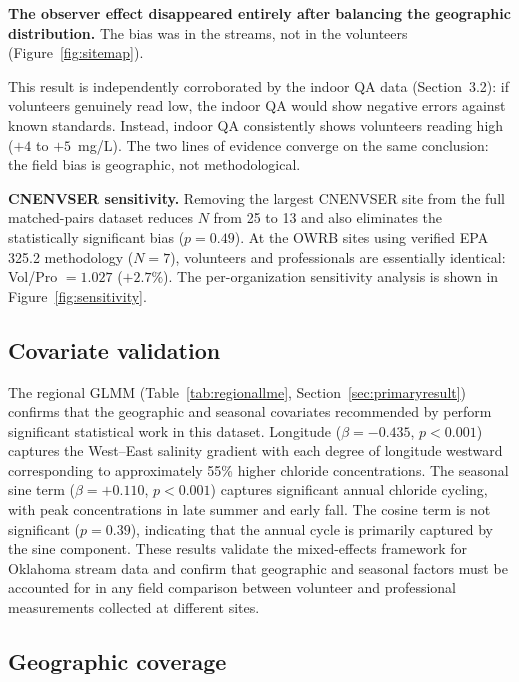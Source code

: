 \documentclass[lineno]{wlpeerj}
\begin{document}
\textbf{The observer effect disappeared entirely after balancing the geographic distribution.} The bias was in the streams, not in the volunteers (Figure~\ref{fig:sitemap}).

This result is independently corroborated by the indoor QA data (Section~3.2): if volunteers genuinely read low, the indoor QA would show negative errors against known standards. Instead, indoor QA consistently shows volunteers reading high ($+4$ to $+5$~mg/L). The two lines of evidence converge on the same conclusion: the field bias is geographic, not methodological.

\textbf{CNENVSER sensitivity.} Removing the largest CNENVSER site from the full matched-pairs dataset reduces $N$ from 25 to 13 and also eliminates the statistically significant bias ($p = 0.49$). At the OWRB sites using verified EPA 325.2 methodology ($N=7$), volunteers and professionals are essentially identical: Vol/Pro $= 1.027$ ($+2.7\%$). The per-organization sensitivity analysis is shown in Figure~\ref{fig:sensitivity}.

\subsection{Covariate validation}

The regional GLMM (Table~\ref{tab:regionallme}, Section~\ref{sec:primaryresult}) confirms that the geographic and seasonal covariates recommended by \citet{Dyer2025} perform significant statistical work in this dataset. Longitude ($\beta = -0.435$, $p < 0.001$) captures the West--East salinity gradient with each degree of longitude westward corresponding to approximately 55\% higher chloride concentrations. The seasonal sine term ($\beta = +0.110$, $p < 0.001$) captures significant annual chloride cycling, with peak concentrations in late summer and early fall. The cosine term is not significant ($p = 0.39$), indicating that the annual cycle is primarily captured by the sine component. These results validate the mixed-effects framework for Oklahoma stream data and confirm that geographic and seasonal factors must be accounted for in any field comparison between volunteer and professional measurements collected at different sites.

\subsection{Geographic coverage}
\label{sec:coverage}
\end{document}
